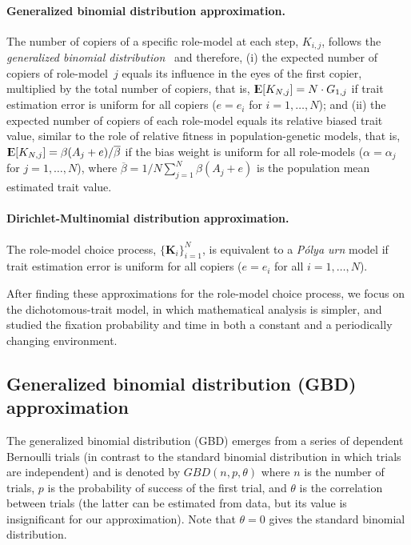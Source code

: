 \documentclass[12pt]{extarticle}
\DeclareMathOperator*{\E}{{\rm I\kern-.3em E}}
\let\vec\mathbf
\begin{document}
\paragraph{Generalized binomial distribution approximation.}  
The number of copiers of a specific role-model at each step, $K_{i,j}$, follows the {\em generalized binomial distribution}~\citep{GBD} and therefore, 
(i) the expected number of copiers of role-model~$j$ equals its influence in the eyes of the first copier, multiplied by the total number of copiers, that is,
$\E[K_{N,j}] = N \cdot G_{1,j}$ if trait estimation error is uniform for all copiers ($e=e_i$ for $i=1, \ldots, N$); and
(ii) the expected number of copiers of each role-model equals its relative biased trait value, similar to the role of relative fitness in population-genetic models, that is, $\E[K_{N,j}] = \beta(A_j+e) / \overline{\beta}$ if the bias weight is uniform for all role-models ($\alpha=\alpha_j$ for $j=1,\ldots,N$), where $\overline{\beta}=1/N \sum_{j=1}^{N}{\beta(A_j+e)}$ is the population mean estimated trait value. 

\paragraph{Dirichlet-Multinomial distribution approximation.}
The role-model choice process, $\{\vec{K}_{i}\}_{i=1}^{N}$, is equivalent to a {\em P\'{o}lya urn} model if trait estimation error is uniform for all copiers ($e=e_i$ for all $i=1, \ldots, N$). 

After finding these approximations for the role-model choice process, we focus on the dichotomous-trait model, in which mathematical analysis is simpler, and studied the fixation probability and time in both a constant and a periodically changing environment.

\subsection*{Generalized binomial distribution (GBD) approximation}
The generalized binomial distribution (GBD) emerges from a series of dependent Bernoulli trials (in contrast to the standard binomial distribution in which trials are independent) and is {denoted}  by $GBD(n, p, \theta)$ where $n$ is the number of trials, $p$ is the probability of success of the first trial, and $\theta$ is the correlation between trials (the latter can be estimated from data, but its value is insignificant for our approximation). Note that $\theta=0$ gives the standard binomial distribution.
\\
\end{document}
